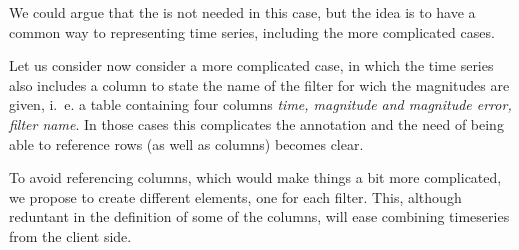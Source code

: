 We could argue that the  is not needed in this case, but the idea is to have a common way to representing time series, including the more complicated cases. 

\newpage 
Let us consider now consider a more complicated case, in which the time series also includes a column to state the name of the filter for wich the magnitudes are given, i.~e. a table containing four columns \emph{time, magnitude and magnitude error, filter name}. In those cases this complicates the annotation and the need of being able to reference rows (as well as columns) becomes clear.

\begingroup

\endgroup

To avoid referencing columns, which would make things a bit more complicated, we propose to create different  elements, one for each filter. This, although reduntant in the definition of some of the columns, will ease combining timeseries from the client side. 


